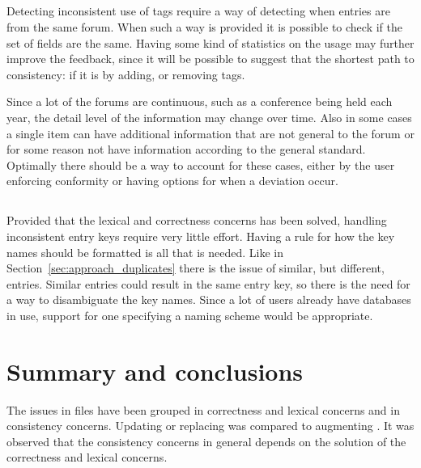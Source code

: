 \subsection{}

Detecting inconsistent use of tags require a way of detecting when
entries are from the same forum.  When such a way is provided it is
possible to check if the set of fields are the same.  Having some kind
of statistics on the usage may further improve the feedback, since it
will be possible to suggest that the shortest path to consistency: if
it is by adding, or removing tags.

Since a lot of the forums are continuous, such as a conference being
held each year, the detail level of the information may change over
time.  Also in some cases a single item can have additional
information that are not general to the forum or for some reason not
have information according to the general standard.  Optimally there
should be a way to account for these cases, either by the user
enforcing conformity or having options for when a deviation occur.


\subsection{}

Provided that the lexical and correctness concerns has been solved,
handling inconsistent entry keys require very little effort.  Having a
rule for how the key names should be formatted is all that is needed.
Like in Section~\ref{sec:approach_duplicates} there is the issue of
similar, but different, entries.  Similar entries could result in the
same entry key, so there is the need for a way to disambiguate the key
names.  Since a lot of users already have databases in use, support
for one specifying a naming scheme would be appropriate.



\section{Summary and conclusions}

The issues in {\bibtex} files have been grouped in correctness and
lexical concerns and in consistency concerns.  Updating or replacing
{\bibtex} was compared to augmenting {\bibtex}.  It was observed that
the consistency concerns in general depends on the solution of the
correctness and lexical concerns.

